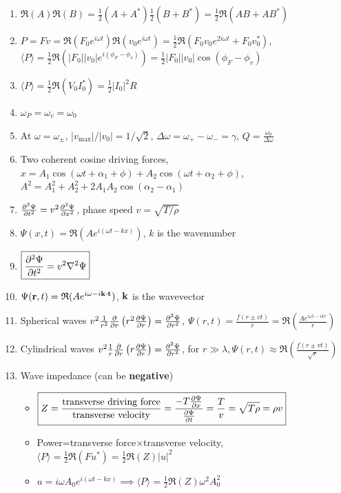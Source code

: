 \documentclass{article}
\theoremstyle{remark}
\theoremstyle{remark}
\newcommand{\realp}[1]{\mathfrak{R}(#1)}
\begin{document}
\begin{enumerate}
\begin{itemize}
    \end{itemize}
    \item $\boxed{\realp{A}\realp{B} = \frac{1}{2}(A+A^*)\frac{1}{2}(B+B^*)=\frac{1}{2}\realp{AB+AB^*}}$
    \item $P = Fv = \realp{F_0 e^{i\omega t}}\realp{v_0 e^{i\omega t}}=\frac{1}{2}\realp{F_0v_0 e^{2i\omega t}+F_0v_0^*} $,
     $\langle P\rangle = \frac{1}{2}\realp{|F_0||v_0|e^{i(\phi_F-\phi_v)}} = \frac{1}{2}|F_0||v_0|\cos(\phi_F-\phi_v) $
    \item $\displaystyle\langle P\rangle = \frac{1}{2}\realp{V_0I_0^*}=\frac{1}{2}|I_0|^2 R$
    \item $\omega_P=\omega_v=\omega_0 $
    \item At $\omega=\omega_\pm$, $|v_{\text{max}}|/|v_0|=1/\sqrt{2} $, $\Delta\omega=\omega_+-\omega_-=\gamma $, $Q = \frac{\omega_0}{\Delta \omega} $
    \item Two coherent cosine driving forces, $x=A_1\cos(\omega t+\alpha_1+\phi)+A_2\cos(\omega t+\alpha_2+\phi) $, $A^2=A_1^2+A_2^2+2A_1A_2\cos(\alpha_2-\alpha_1) $
    \item $\pdv[2]{\Psi}{t} = v^2\pdv[2]{\Psi}{x} $, phase speed $v=\sqrt{T/\rho} $
    \item $\Psi(x,t) = \realp{Ae^{i(\omega t-kx)}} $, $k$ is the wavenumber
    \item $\boxed{\pdv[2]{\Psi}{t} = v^2\laplacian\Psi}$
    \item $\Psi(\vb{r},t)=\realp{Ae^{i\omega-i\vb{k}\cdot\vb{t}}} $, $\vb{k}$ is the wavevector
    \item Spherical waves $v^2\frac{1}{r^2}\pdv{r}\left(r^2\pdv{\Psi}{r}\right) = \pdv[2]{\Psi}{r} $, $\Psi(r,t) = \frac{f(r\pm vt)}{r} = \realp{\frac{Ae^{i\omega t-ikr}}{r}} $
    \item Cylindrical waves $v^2\frac{1}{r}\pdv{r}\left(r\pdv{\Psi}{r}\right)=\pdv[2]{\Psi}{r} $, for $r\gg\lambda, \Psi(r,t)\approx\realp{\frac{f(r\pm vt)}{\sqrt{r}}}$
    \item Wave impedance (can be \textbf{negative})\begin{itemize}
        \item $\boxed{Z = \frac{\text{transverse driving force}}{\text{transverse velocity}} = \frac{-T\pdv{\Psi}{x}}{\pdv{\Psi}{t}} =  \frac{T}{v} = \sqrt{T\rho} = \rho v }$
        \item Power=transverse force$\times$transverse velocity, $\langle P\rangle = \frac{1}{2}\realp{Fu^*} = \frac{1}{2}\realp{Z}|u|^2 $
        \item $u=i\omega A_0e^{i(\omega t-kx)}\implies \boxed{\langle P\rangle=\frac{1}{2}\realp{Z}\omega^2A_0^2}$

\end{itemize}
\end{enumerate}
\end{document}
